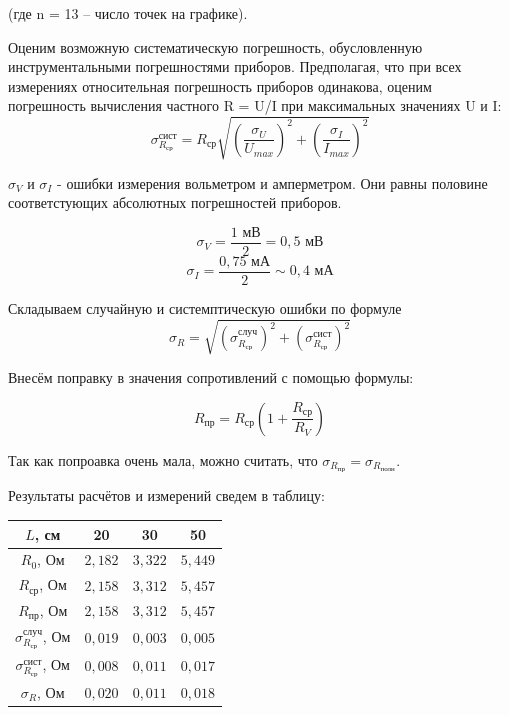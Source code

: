 (где n = 13 – число точек на графике).


Оценим возможную систематическую погрешность, обусловленную инструментальными
погрешностями приборов. Предполагая, что при всех измерениях относительная погрешность приборов одинакова, оценим погрешность вычисления частного R = U/I при максимальных
значениях U и I:
\[\sigma_{R_\text{ср}}^{\text{сист}} = R_\text{ср} \sqrt{\left(\frac{\sigma{_{U}}}{U_{max}}\right)^2 + \left( \frac{\sigma{_{I}}}{I_{max}}\right)^2}\]

$\sigma_V$ и $\sigma_I$ - ошибки измерения вольметром и амперметром. Они равны половине соответстующих абсолютных погрешностей приборов.

\[\sigma_V = \frac{1\text{ мВ}}{2} = 0,5 \text{ мВ} \]
\[\sigma_I = \frac{0,75\text{ мА}}{2} \sim 0,4 \text{ мА} \]


Складываем случайную и системптическую ошибки по формуле
\[\sigma_R = \sqrt{(\sigma_{R_{\text{ср}}}^{\text{случ}})^2 + (\sigma_{R_\text{ср}}^{\text{сист}})^2}\]


Внесём поправку в значения сопротивлений с помощью формулы:

\[R_{\text{пр}} = R_{\text{ср}} (1 + \frac{R_{\text{ср}}}{R_V})\]

Так как попроавка очень мала, можно считать, что $\sigma_{R_{\text{пр}}} = \sigma_{R_{\text{полн}}}$.

Результаты расчётов и измерений сведем в таблицу:

\begin{center}
    \begin{tabular}{|c|c|c|c|}
        \hline
        $L$, см                                    & 20      & 30      & 50      \\
        \hline
        \hline
        $R_{0}$, Ом                                & $2,182$ & $3,322$ & $5,449$ \\
        \hline
        $R_{\text{ср}}$, Ом                        & $2,158$ & $3,312$ & $5,457$ \\
        \hline
        $R_{\text{пр}}$, Ом                        & $2,158$ & $3,312$ & $5,457$ \\
        \hline
        $\sigma_{R_{\text{ср}}}^{\text{случ}}$, Ом & $0,019$ & $0,003$ & $0,005$ \\
        \hline
        $\sigma_{R_\text{ср}}^{\text{сист}}$, Ом   & $0,008$ & $0,011$ & $0,017$ \\
        \hline
        $\sigma_{R}$, Ом                           & $0,020$ & $0,011$ & $0,018$ \\
        \hline
    \end{tabular}
\end{center}

